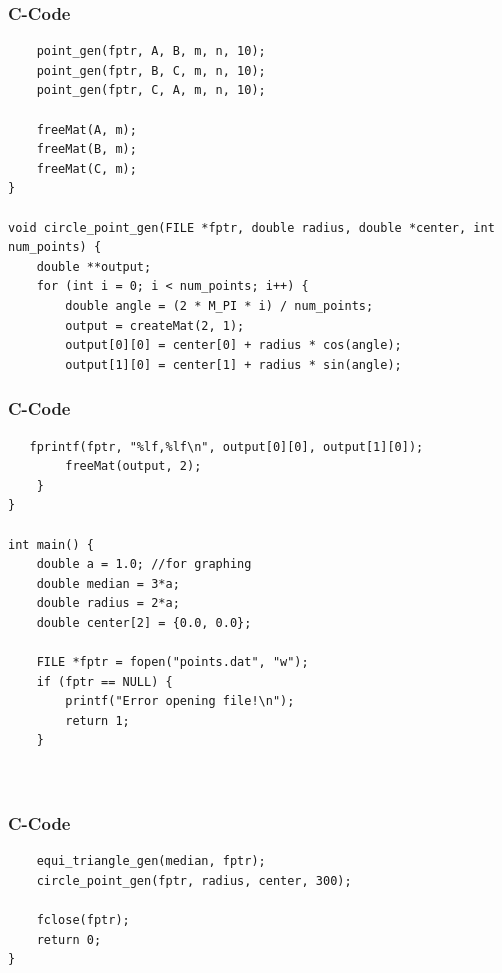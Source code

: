 \documentclass{beamer}
\begin{document}
\begin{frame}[fragile]
\frametitle{C-Code}
\begin{verbatim}
    point_gen(fptr, A, B, m, n, 10);
    point_gen(fptr, B, C, m, n, 10);
    point_gen(fptr, C, A, m, n, 10);

    freeMat(A, m);
    freeMat(B, m);
    freeMat(C, m);
}

void circle_point_gen(FILE *fptr, double radius, double *center, int num_points) {
    double **output;
    for (int i = 0; i < num_points; i++) {
        double angle = (2 * M_PI * i) / num_points;
        output = createMat(2, 1);
        output[0][0] = center[0] + radius * cos(angle);
        output[1][0] = center[1] + radius * sin(angle);

\end{verbatim}
\end{frame}

\begin{frame}[fragile]
\frametitle{C-Code}
\begin{verbatim}
   fprintf(fptr, "%lf,%lf\n", output[0][0], output[1][0]);
        freeMat(output, 2);
    }
}

int main() {
    double a = 1.0; //for graphing
    double median = 3*a;
    double radius = 2*a; 
    double center[2] = {0.0, 0.0};

    FILE *fptr = fopen("points.dat", "w");
    if (fptr == NULL) {
        printf("Error opening file!\n");
        return 1;
    }

    
\end{verbatim}
\end{frame}

\begin{frame}[fragile]
\frametitle{C-Code}
\begin{verbatim}
    equi_triangle_gen(median, fptr);
    circle_point_gen(fptr, radius, center, 300);

    fclose(fptr);
    return 0;
}
\end{verbatim}
\end{frame}
\end{document}
